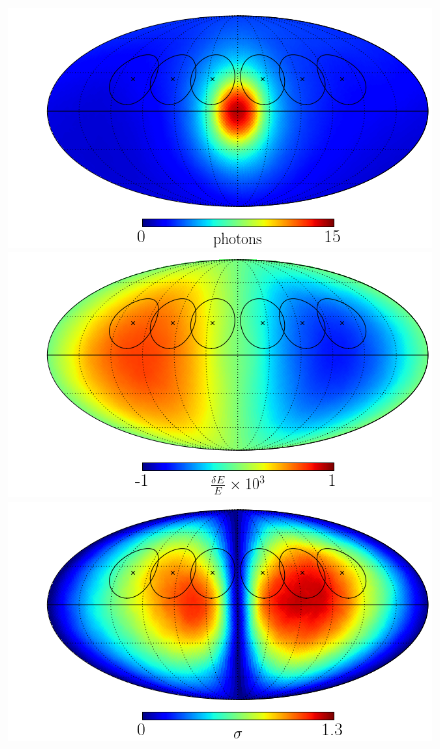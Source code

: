 \documentclass[aps,prd,10pt,twocolumn,superscriptaddress,showpacs,footinbib]{revtex4-1}
\begin{document}
\begin{figure}[h!]
\centering
	\includegraphics[width=0.99\columnwidth]{flux_map_374.png}
	\includegraphics[width=0.99\columnwidth]{line_map_374.png}
	\includegraphics[width=0.99\columnwidth]{sigma_map_374.png}

\end{figure}
\end{document}
